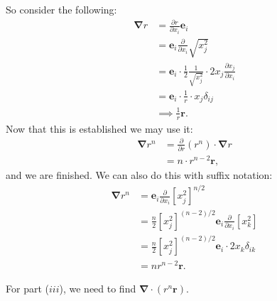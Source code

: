 \begin{enumerate}
    So consider the following:
    \begin{align*}
        \boldsymbol{\nabla} r
        &= \frac{\partial r}{\partial x_i}\boldsymbol{e}_i \\
        &= \boldsymbol{e}_i\frac{\partial}{\partial x_i}\sqrt{x_j^2} \\
        &= \boldsymbol{e}_i\cdot\frac{1}{2}\frac{1}{\sqrt{x_j^2}}
        \cdot 2x_j\frac{\partial x_j}{\partial x_i} \\
        &= \boldsymbol{e}_i\cdot\frac{1}{r}\cdot x_j\delta_{ij} \\
        &\implies \frac{1}{r}\boldsymbol{r}.
    \end{align*}
    Now that this is established we may use it:
    \begin{align*}
        \boldsymbol{\nabla}r^n
        &= \frac{\partial}{\partial r}(r^n)\cdot
        \boldsymbol{\nabla}r \\
        &= n\cdot r^{n-2}\boldsymbol{r},
    \end{align*}
    and we are finished. We can also do this with suffix notation:
    \begin{align*}
        \boldsymbol{\nabla}r^n
        &=\boldsymbol{e}_i\frac{\partial}{\partial x_i}[x_j^2]^{n/2} \\
        &=\frac{n}{2}[x_j^2]^{(n-2)/2}\boldsymbol{e}_i\frac{\partial}{\partial x_i}[x_k^2] \\
        &=\frac{n}{2}[x_j^2]^{(n-2)/2}\boldsymbol{e}_i\cdot2x_k\delta_{ik} \\
        &=n r^{n-2}\boldsymbol{r}.
    \end{align*}

    For part ($iii$), we need to find
    $\boldsymbol{\nabla}\cdot(r^n\boldsymbol{r})$.


\end{enumerate}
